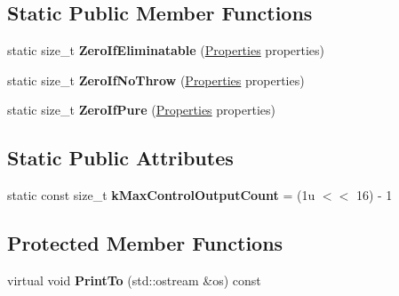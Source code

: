 \subsection*{Static Public Member Functions}
\begin{DoxyCompactItemize}
\item 
static size\+\_\+t {\bfseries Zero\+If\+Eliminatable} (\hyperlink{classv8_1_1base_1_1_flags}{Properties} properties)\hypertarget{classv8_1_1internal_1_1compiler_1_1_operator_abfd4399c6dc901728864bf616c52b5ce}{}\label{classv8_1_1internal_1_1compiler_1_1_operator_abfd4399c6dc901728864bf616c52b5ce}

\item 
static size\+\_\+t {\bfseries Zero\+If\+No\+Throw} (\hyperlink{classv8_1_1base_1_1_flags}{Properties} properties)\hypertarget{classv8_1_1internal_1_1compiler_1_1_operator_a33ac290c997f8d9889d20c6e34b7d622}{}\label{classv8_1_1internal_1_1compiler_1_1_operator_a33ac290c997f8d9889d20c6e34b7d622}

\item 
static size\+\_\+t {\bfseries Zero\+If\+Pure} (\hyperlink{classv8_1_1base_1_1_flags}{Properties} properties)\hypertarget{classv8_1_1internal_1_1compiler_1_1_operator_ac05d4213206e14d84b683018c2e996d5}{}\label{classv8_1_1internal_1_1compiler_1_1_operator_ac05d4213206e14d84b683018c2e996d5}

\end{DoxyCompactItemize}
\subsection*{Static Public Attributes}
\begin{DoxyCompactItemize}
\item 
static const size\+\_\+t {\bfseries k\+Max\+Control\+Output\+Count} = (1u $<$$<$ 16) -\/ 1\hypertarget{classv8_1_1internal_1_1compiler_1_1_operator_a53db1ad736625bfeee9b9e3985bcafc0}{}\label{classv8_1_1internal_1_1compiler_1_1_operator_a53db1ad736625bfeee9b9e3985bcafc0}

\end{DoxyCompactItemize}
\subsection*{Protected Member Functions}
\begin{DoxyCompactItemize}
\item 
virtual void {\bfseries Print\+To} (std\+::ostream \&os) const \hypertarget{classv8_1_1internal_1_1compiler_1_1_operator_a3308d0fc4fa4ab1ecb27358f99663f76}{}\label{classv8_1_1internal_1_1compiler_1_1_operator_a3308d0fc4fa4ab1ecb27358f99663f76}

\end{DoxyCompactItemize}
